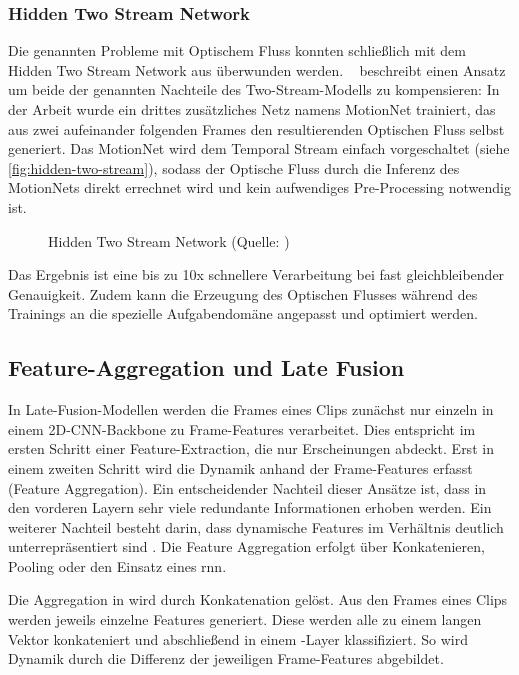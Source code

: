\subsubsection{Hidden Two Stream Network}

Die genannten Probleme mit Optischem Fluss konnten schließlich mit dem Hidden Two Stream Network aus \cite{Zhu17} überwunden werden.
~\cite{Zhu17} beschreibt einen Ansatz um beide der genannten Nachteile des Two-Stream-Modells zu kompensieren:
In der Arbeit wurde ein drittes zusätzliches Netz namens MotionNet trainiert, das aus zwei aufeinander folgenden Frames den resultierenden Optischen Fluss selbst generiert.
Das MotionNet wird dem Temporal Stream einfach vorgeschaltet (siehe \autoref{fig:hidden-two-stream}), sodass der Optische Fluss durch die Inferenz des MotionNets direkt errechnet wird und kein aufwendiges Pre-Processing notwendig ist.

\begin{figure}[h!]
    \centering
    \caption{Hidden Two Stream Network (Quelle: \cite{Zhu17})}
    \label{fig:hidden-two-stream}
\end{figure}

Das Ergebnis ist eine bis zu 10x schnellere Verarbeitung bei fast gleichbleibender Genauigkeit.
Zudem kann die Erzeugung des Optischen Flusses während des Trainings an die spezielle Aufgabendomäne angepasst und optimiert werden.

\subsection{Feature-Aggregation und Late Fusion}
\label{subsec:late-fusion}

In Late-Fusion-Modellen werden die Frames eines Clips zunächst nur einzeln in einem 2D-CNN-Backbone zu Frame-Features verarbeitet.
Dies entspricht im ersten Schritt einer Feature-Extraction, die nur Erscheinungen abdeckt.
Erst in einem zweiten Schritt wird die Dynamik anhand der Frame-Features erfasst (Feature Aggregation).
Ein entscheidender Nachteil dieser Ansätze ist, dass in den vorderen Layern sehr viele redundante Informationen erhoben werden.
Ein weiterer Nachteil besteht darin, dass dynamische Features im Verhältnis deutlich unterrepräsentiert sind \cite{Karpathy14}.
Die Feature Aggregation erfolgt über Konkatenieren, Pooling oder den Einsatz eines \gls{rnn}.

Die Aggregation in \cite{Karpathy14} wird durch Konkatenation gelöst.
Aus den Frames eines Clips werden jeweils einzelne Features generiert.
Diese werden alle zu einem langen Vektor konkateniert und abschließend in einem \fc-Layer klassifiziert.
So wird Dynamik durch die Differenz der jeweiligen Frame-Features abgebildet.


